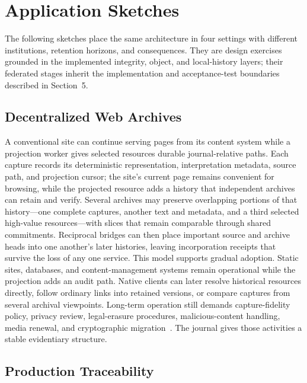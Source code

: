 \section{Application Sketches}
\label{sec:applications}
\label{sec:worked-example}

The following sketches place the same architecture in four settings with different institutions, retention horizons, and consequences. They are design exercises grounded in the implemented integrity, object, and local-history layers; their federated stages inherit the implementation and acceptance-test boundaries described in Section~5.

\subsection{Decentralized Web Archives}

A conventional site can continue serving pages from its content system while a projection worker gives selected resources durable journal-relative paths. Each capture records its deterministic representation, interpretation metadata, source path, and projection cursor; the site's current page remains convenient for browsing, while the projected resource adds a history that independent archives can retain and verify. Several archives may preserve overlapping portions of that history---one complete captures, another text and metadata, and a third selected high-value resources---with slices that remain comparable through shared commitments. Reciprocal bridges can then place important source and archive heads into one another's later histories, leaving incorporation receipts that survive the loss of any one service. This model supports gradual adoption. Static sites, databases, and content-management systems remain operational while the projection adds an audit path. Native clients can later resolve historical resources directly, follow ordinary links into retained versions, or compare captures from several archival viewpoints. Long-term operation still demands capture-fidelity policy, privacy review, legal-erasure procedures, malicious-content handling, media renewal, and cryptographic migration~\cite{Chun2009tiered}. The journal gives those activities a stable evidentiary structure.

\subsection{Production Traceability}

